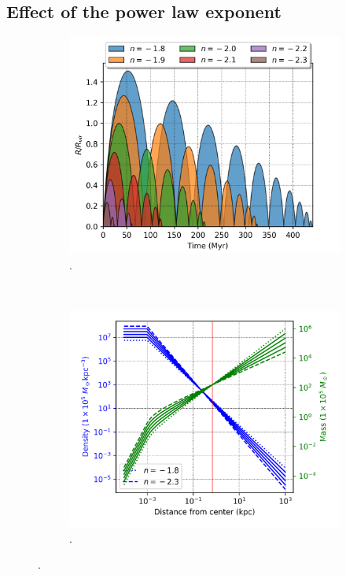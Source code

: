 	\subsection{Effect of the power law exponent}
	\begin{figure}[h]
		\centering
		\begin{subfigure}[b]{0.49\textwidth}
			\includegraphics[width = \textwidth]{"../Files/Week 6/power_law"}
			\caption{.}
			\label{fig: powerLawOrbits}
		\end{subfigure}
		~ 
		\begin{subfigure}[b]{0.49\textwidth}
			\includegraphics[width=\textwidth]{"../Files/Week 6/power_law_density"}
			\caption{.}
			\label{fig: powerLawDensities}
		\end{subfigure}
		\caption{.}
		\label{fig: powerLaw}
	\end{figure}
	
